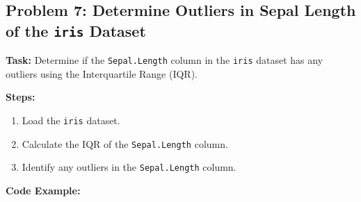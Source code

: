 \documentclass[
  letterpaper,
  DIV=11,
  numbers=noendperiod]{scrreprt}
\newenvironment{Shaded}{\begin{snugshade}}{\end{snugshade}}
\newcommand{\CommentTok}[1]{\textcolor[rgb]{0.37,0.37,0.37}{#1}}
\newcommand{\FloatTok}[1]{\textcolor[rgb]{0.68,0.00,0.00}{#1}}
\newcommand{\FunctionTok}[1]{\textcolor[rgb]{0.28,0.35,0.67}{#1}}
\newcommand{\NormalTok}[1]{\textcolor[rgb]{0.00,0.23,0.31}{#1}}
\newcommand{\OtherTok}[1]{\textcolor[rgb]{0.00,0.23,0.31}{#1}}
\newcommand{\SpecialCharTok}[1]{\textcolor[rgb]{0.37,0.37,0.37}{#1}}
\providecommand{\tightlist}{%
  \setlength{\itemsep}{0pt}\setlength{\parskip}{0pt}}\usepackage{longtable,booktabs,array}
\begin{document}
\subsection*{\texorpdfstring{Problem 7: Determine Outliers in Sepal
Length of the \texttt{iris}
Dataset}{Problem 7: Determine Outliers in Sepal Length of the iris Dataset}}\label{problem-7-determine-outliers-in-sepal-length-of-the-iris-dataset}

\textbf{Task:} Determine if the \texttt{Sepal.Length} column in the
\texttt{iris} dataset has any outliers using the Interquartile Range
(IQR).

\textbf{Steps:}

\begin{enumerate}
\def\labelenumi{\arabic{enumi}.}
\tightlist
\item
  Load the \texttt{iris} dataset.
\item
  Calculate the IQR of the \texttt{Sepal.Length} column.
\item
  Identify any outliers in the \texttt{Sepal.Length} column.
\end{enumerate}

\textbf{Code Example:}

\begin{Shaded}
\end{Shaded}
\end{document}

